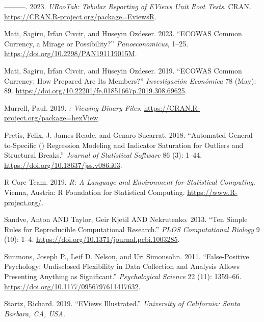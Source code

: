 \begin{CSLReferences}{1}{0}
\leavevmode{}%
---------. 2023. \emph{{URooTab}: Tabular Reporting of {EViews} Unit Root Tests}. CRAN. \url{https://CRAN.R-project.org/package=EviewsR}.

\leavevmode{}%
Mati, Sagiru, Irfan Civcir, and Huseyin Ozdeser. 2023. {``{ECOWAS} Common Currency, a Mirage or Possibility?''} \emph{Panoeconomicus}, 1--25. \url{https://doi.org/10.2298/PAN191119015M}.

\leavevmode{}%
Mati, Sagiru, Irfan Civcir, and Hüseyin Ozdeser. 2019. {``{ECOWAS} Common Currency: How Prepared Are Its Members?''} \emph{Investigación Económica} 78 (May): 89. \url{https://doi.org/10.22201/fe.01851667p.2019.308.69625}.

\leavevmode{}%
Murrell, Paul. 2019. \emph{: Viewing Binary Files}. \url{https://CRAN.R-project.org/package=hexView}.

\leavevmode{}%
Pretis, Felix, J. James Reade, and Genaro Sucarrat. 2018. {``Automated General-to-Specific () Regression Modeling and Indicator Saturation for Outliers and Structural Breaks.''} \emph{Journal of Statistical Software} 86 (3): 1--44. \url{https://doi.org/10.18637/jss.v086.i03}.

\leavevmode{}%
R Core Team. 2019. \emph{R: A Language and Environment for Statistical Computing}. Vienna, Austria: R Foundation for Statistical Computing. \url{https://www.R-project.org/}.

\leavevmode{}%
Sandve, Anton AND Taylor, Geir Kjetil AND Nekrutenko. 2013. {``Ten Simple Rules for Reproducible Computational Research.''} \emph{PLOS Computational Biology} 9 (10): 1--4. \url{https://doi.org/10.1371/journal.pcbi.1003285}.

\leavevmode{}%
Simmons, Joseph P., Leif D. Nelson, and Uri Simonsohn. 2011. {``False-Positive Psychology: Undisclosed Flexibility in Data Collection and Analysis Allows Presenting Anything as Significant.''} \emph{Psychological Science} 22 (11): 1359--66. \url{https://doi.org/10.1177/0956797611417632}.

\leavevmode{}%
Startz, Richard. 2019. {``EViews Illustrated.''} \emph{University of California: Santa Barbara, CA, USA}.


\end{CSLReferences}
